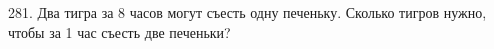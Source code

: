 281. Два тигра за 8 часов могут съесть одну печеньку. Сколько тигров нужно, чтобы за 1 час съесть две печеньки?\\
